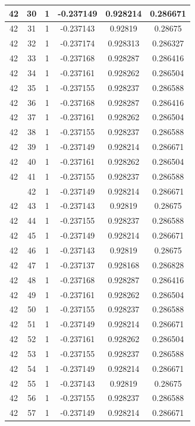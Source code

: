 \documentclass[12pt,a4paper]{article}
\numberwithin{equation}{section}
\numberwithin{figure}{section}
\numberwithin{table}{section}
\begin{document}
\begin{longtable}{|c|c|c|c|c|c|}
42 & 30 & 1 & -0.237149 & 0.928214 & 0.286671 \\ \hline
42 & 31 & 1 & -0.237143 & 0.92819 & 0.28675 \\ \hline
42 & 32 & 1 & -0.237174 & 0.928313 & 0.286327 \\ \hline
42 & 33 & 1 & -0.237168 & 0.928287 & 0.286416 \\ \hline
42 & 34 & 1 & -0.237161 & 0.928262 & 0.286504 \\ \hline
42 & 35 & 1 & -0.237155 & 0.928237 & 0.286588 \\ \hline
42 & 36 & 1 & -0.237168 & 0.928287 & 0.286416 \\ \hline
42 & 37 & 1 & -0.237161 & 0.928262 & 0.286504 \\ \hline
42 & 38 & 1 & -0.237155 & 0.928237 & 0.286588 \\ \hline
42 & 39 & 1 & -0.237149 & 0.928214 & 0.286671 \\ \hline
42 & 40 & 1 & -0.237161 & 0.928262 & 0.286504 \\ \hline
42 & 41 & 1 & -0.237155 & 0.928237 & 0.286588 \\ \hline
\pagebreak
42 & 42 & 1 & -0.237149 & 0.928214 & 0.286671 \\ \hline
42 & 43 & 1 & -0.237143 & 0.92819 & 0.28675 \\ \hline
42 & 44 & 1 & -0.237155 & 0.928237 & 0.286588 \\ \hline
42 & 45 & 1 & -0.237149 & 0.928214 & 0.286671 \\ \hline
42 & 46 & 1 & -0.237143 & 0.92819 & 0.28675 \\ \hline
42 & 47 & 1 & -0.237137 & 0.928168 & 0.286828 \\ \hline
42 & 48 & 1 & -0.237168 & 0.928287 & 0.286416 \\ \hline
42 & 49 & 1 & -0.237161 & 0.928262 & 0.286504 \\ \hline
42 & 50 & 1 & -0.237155 & 0.928237 & 0.286588 \\ \hline
42 & 51 & 1 & -0.237149 & 0.928214 & 0.286671 \\ \hline
42 & 52 & 1 & -0.237161 & 0.928262 & 0.286504 \\ \hline
42 & 53 & 1 & -0.237155 & 0.928237 & 0.286588 \\ \hline
42 & 54 & 1 & -0.237149 & 0.928214 & 0.286671 \\ \hline
42 & 55 & 1 & -0.237143 & 0.92819 & 0.28675 \\ \hline
42 & 56 & 1 & -0.237155 & 0.928237 & 0.286588 \\ \hline
42 & 57 & 1 & -0.237149 & 0.928214 & 0.286671 \\ \hline

\end{longtable}
\end{document}
